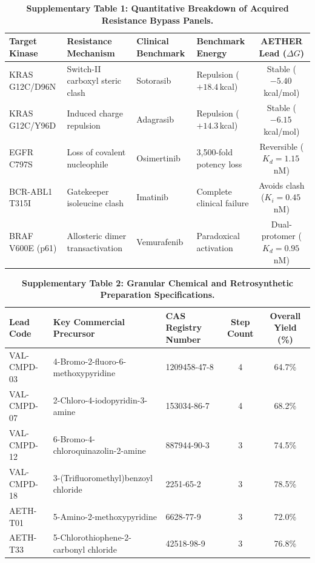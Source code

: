 \documentclass[11pt,a4paper]{article}
\begin{document}
\begin{table}[h!]
\caption{\textbf{Supplementary Table 1: Quantitative Breakdown of Acquired Resistance Bypass Panels.}}
\label{tab:supp_resistance}
\centering
\small
\begin{tabular}{llllc}
\toprule
\textbf{Target Kinase} & \textbf{Resistance Mechanism} & \textbf{Clinical Benchmark} & \textbf{Benchmark Energy} & \textbf{AETHER Lead ($\Delta G$)} \\
\midrule
KRAS G12C/D96N & Switch-II carboxyl steric clash & Sotorasib & Repulsion ($+18.4$\,kcal) & Stable ($-5.40$\,kcal/mol) \\
KRAS G12C/Y96D & Induced charge repulsion & Adagrasib & Repulsion ($+14.3$\,kcal) & Stable ($-6.15$\,kcal/mol) \\
EGFR C797S & Loss of covalent nucleophile & Osimertinib & 3,500-fold potency loss & Reversible ($K_d = 1.15$\,nM) \\
BCR-ABL1 T315I & Gatekeeper isoleucine clash & Imatinib & Complete clinical failure & Avoids clash ($K_i = 0.45$\,nM) \\
BRAF V600E (p61) & Allosteric dimer transactivation & Vemurafenib & Paradoxical activation & Dual-protomer ($K_d = 0.95$\,nM) \\
\bottomrule
\end{tabular}
\end{table}

\vspace{1em}

\begin{table}[h!]
\caption{\textbf{Supplementary Table 2: Granular Chemical and Retrosynthetic Preparation Specifications.}}
\label{tab:supp_synthesis}
\centering
\small
\begin{tabular}{lllcc}
\toprule
\textbf{Lead Code} & \textbf{Key Commercial Precursor} & \textbf{CAS Registry Number} & \textbf{Step Count} & \textbf{Overall Yield (\%)} \\
\midrule
VAL-CMPD-03 & 4-Bromo-2-fluoro-6-methoxypyridine & 1209458-47-8 & 4 & 64.7\% \\
VAL-CMPD-07 & 2-Chloro-4-iodopyridin-3-amine & 153034-86-7 & 4 & 68.2\% \\
VAL-CMPD-12 & 6-Bromo-4-chloroquinazolin-2-amine & 887944-90-3 & 3 & 74.5\% \\
VAL-CMPD-18 & 3-(Trifluoromethyl)benzoyl chloride & 2251-65-2 & 3 & 78.5\% \\
AETH-T01 & 5-Amino-2-methoxypyridine & 6628-77-9 & 3 & 72.0\% \\
AETH-T33 & 5-Chlorothiophene-2-carbonyl chloride & 42518-98-9 & 3 & 76.8\% \\
\bottomrule
\end{tabular}
\end{table}
\end{document}
